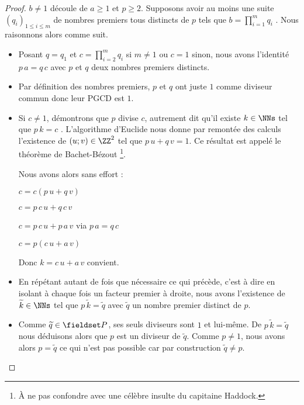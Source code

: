 \begin{proof}
	$b \neq 1$ découle de $a \geq 1$ et $p \geq 2$. 
	Supposons avoir au moins une suite $(q_i)_{1 \leq i \leq m}$ de nombres premiers tous distincts de $p$ tels que $\displaystyle b = \prod_{i=1}^{m} q_i$ .
	Nous raisonnons alors comme suit.
	\begin{itemize}[label=\small\textbullet]
		\item Posant $q = q_1$ et $\displaystyle c = \prod_{i=2}^{m} q_i$ si $m \neq 1$ ou $c=1$ sinon, nous avons l'identité $p \, a = q \, c$ avec $p$ et $q$ deux nombres premiers distincts.
		
		
		\item Par définition des nombres premiers, $p$ et $q$ ont juste $1$ comme diviseur commun donc leur PGCD est $1$.

	
		\item Si $c \neq 1$, démontrons que $p$ divise $c$, autrement dit qu'il existe $k \in \NNs$ tel que $p \, k = c$ .
		L'algorithme d'Euclide nous donne par remontée des calculs l'existence de $(u ; v) \in \ZZ^2$ tel que $p \, u + q \, v = 1$. Ce résultat est appelé le théorème de Bachet-Bézout
		\footnote{
			À ne pas confondre avec une célèbre insulte du capitaine Haddock.
		}.
		
		\smallskip
		\noindent
		Nous avons alors sans effort :
		
		\smallskip
		\noindent
		$c = c(p \, u + q \, v)$
		
		\smallskip
		\noindent
		$c = p \, c \, u + q \, c \, v$
		
		\smallskip
		\noindent
		$c = p \, c \, u + p \, a \, v$ via $p \, a = q \, c$
		
		\smallskip
		\noindent
		$c = p(c \, u + a \, v)$
		
		\smallskip
		\noindent
		Donc $k = c \, u + a \, v$ convient.
		
		
		\item En répétant autant de fois que nécessaire ce qui précède, c'est à dire en isolant à chaque fois un facteur premier à droite, nous avons l'existence de $\widetilde{k} \in \NNs$ tel que $p \, \widetilde{k} = \widetilde{q}$ avec $\widetilde{q}$ un nombre premier distinct de $p$.

	
		\item Comme $\widetilde{q} \in \PP$, ses seuls diviseurs sont $1$ et lui-même. De $p \, \widetilde{k} = \widetilde{q}$ nous déduisons alors que $p$ est un diviseur de $\widetilde{q}$. Comme $p \neq 1$, nous avons alors $p = \widetilde{q}$ ce qui n'est pas possible car par construction $\widetilde{q} \neq p$.
	\end{itemize}
\end{proof}


